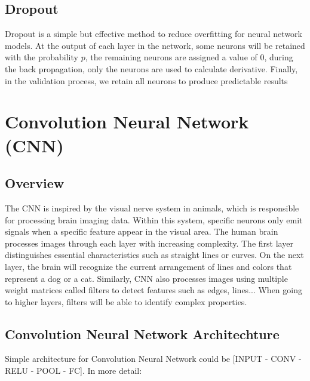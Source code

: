 \subsection{Dropout}
Dropout \cite{Srivastava:2014:DSW:2627435.2670313} is a simple but effective method to reduce overfitting for neural network models.
At the output of each layer in the network, some neurons will be retained with the probability $p$, the remaining neurons are assigned a value of 0, during the back propagation, only the neurons are used to calculate derivative. Finally, in the validation process, we retain all neurons to produce predictable results
\section{Convolution Neural Network (CNN)}
\subsection{Overview}
The CNN is inspired by the visual nerve system in animals, which is responsible for processing brain imaging data. Within this system, specific neurons only emit signals when a specific feature appear in the visual area. The human brain processes images through each layer with increasing complexity. The first layer distinguishes essential characteristics such as straight lines or curves. On the next layer, the brain will recognize the current arrangement of lines and colors that represent a dog or a cat. Similarly, CNN also processes images using multiple weight matrices called filters to detect features such as edges, lines... When going to higher layers, filters will be able to identify complex properties.

\subsection{Convolution Neural Network Architechture}
Simple architecture for Convolution Neural Network could be [INPUT - CONV - RELU - POOL - FC]. In more detail:

